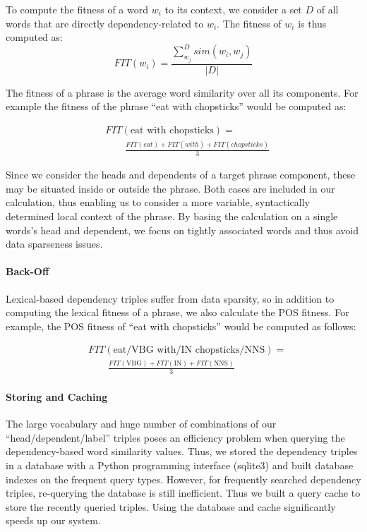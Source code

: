 \documentclass[11pt]{article}
\begin{document}
To compute the fitness of a word $w_i$ to its context, we consider a set $D$ of all words that are directly dependency-related to $w_i$. The fitness of $w_i$ is thus computed as:\\
\begin{equation}
FIT(w_i) =  \frac {  \sum_{w_j}^{D} sim(w_i,w_j) } {  |D|}
\end{equation}

The fitness of a phrase is the average word similarity over all its components. For example the fitness of the phrase ``eat with chopsticks'' would be computed as:

\begin{align}
& FIT(\mbox{eat with chopsticks}) = \nonumber \\
 & \qquad \frac{FIT(eat) + FIT(with) + FIT(chopsticks)}{3}
\end{align}

Since we consider the heads and dependents of a target phrase component, these may be situated  inside or outside the phrase. Both cases are included in our calculation, thus enabling us to consider a more variable, syntactically determined local context of the phrase.
By basing the calculation on a  single words's head and dependent, we focus on  tightly associated words and thus avoid data sparseness issues.

\paragraph{Back-Off}
Lexical-based dependency triples suffer from data sparsity, so in addition to computing the lexical fitness of a phrase, we also calculate the POS fitness. For example, the POS fitness of ``eat with chopsticks'' would be computed as follows:

\begin{align}
& FIT(\mbox{eat/VBG with/IN chopsticks/NNS}) = \nonumber \\
 & \qquad \frac{FIT(\mbox{VBG}) + FIT(\mbox{IN}) + FIT(\mbox{NNS})}{3} 
\end{align}



\paragraph{Storing and Caching}
The large vocabulary and huge number of combinations of our ``head/dependent/label'' triples poses an efficiency problem when querying the dependency-based word similarity values. Thus, we stored the dependency triples in a database with a Python programming interface (sqlite3) and built database indexes on the frequent query types. However, for frequently searched dependency triples, re-querying the database is still inefficient. Thus we built a query cache to store the recently queried triples. Using the database and cache significantly speeds up our system. 
\end{document}
